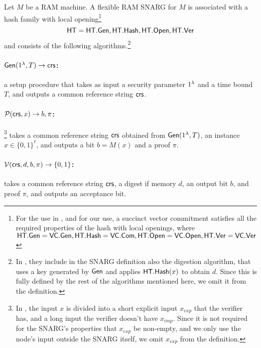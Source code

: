 Let $M$ be a RAM machine. A flexible RAM SNARG for $M$ is associated with a hash family with local opening\footnote{
For the use in \cite{cryptoeprint:2022/1320}, and for our use, a succinct vector commitment satisfies all the required properties of the hash with local openings, where $\mathsf{HT}.\mathsf{Gen} = \mathsf{VC}.\mathsf{Gen}, \mathsf{HT}.\mathsf{Hash} = \mathsf{VC}.\mathsf{Com}, \mathsf{HT}.\mathsf{Open} = \mathsf{VC}.\mathsf{Open}, \mathsf{HT}.\mathsf{Ver} = \mathsf{VC}.\mathsf{Ver}$
}
$$\mathsf{HT} = \mathsf{HT}.\mathsf{Gen}, \mathsf{HT}.\mathsf{Hash}, \mathsf{HT}.\mathsf{Open}, \mathsf{HT}.\mathsf{Ver}$$ and consists of the following  algorithms.\footnote{
In \cite{cryptoeprint:2022/1320}, they include in the SNARG definition also the digestion algorithm, that uses a key generated by $\mathsf{Gen}$ and applies $\mathsf{HT}.\mathsf{Hash}(x)$ to obtain $d$. Since this is fully defined by the rest of the algorithms mentioned here, we omit it from the definition.
}
\paragraph{$\Gen(1^\secpar, T)\to \var{\crs%
}$:} a setup procedure that takes as input a security parameter $1^\lambda$ and a time bound $T$, and outputs a common reference string $\mathit{ \mathsf{crs} }$.

\paragraph{$\mathcal{P}(\mathit{ \mathsf{crs} }, x)\to b, \pi$:}\footnote{
In \cite{cryptoeprint:2022/1320}, the input $x$ is divided into a short explicit input $x_{exp}$ that the verifier has, and a long input the verifier doesn't have $x_{imp}$. Since it is not required for the SNARG's properties that $x_{exp}$ be non-empty, and we only use the node's input outside the SNARG itself, we omit $x_{exp}$ from the definition.
}
takes a common reference string $\mathit{ \mathsf{crs} }$ obtained from $\mathsf{Gen}(1^{\lambda}, T)$,
an instance $x\in\{0,1\}^\ell$, and outputs a bit $b = M(x)$ and a proof $\pi$.

\paragraph{$\Ver(\var{\crs}, %
d, b, \pi)\to \set{0,1}$:} takes a common reference string $\mathit{ \mathsf{crs} }$, %
a digest if memory $d$, an output bit $b$, and proof $\pi$,
and outputs an acceptance bit.


